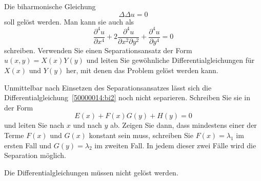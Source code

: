 Die biharmonische Gleichung
\begin{equation}
\Delta\Delta u =0
\label{50000014:bi}
\end{equation}
soll
gelöst werden.
Man kann sie auch als
\begin{equation}
\frac{\partial^4u}{\partial x^4}
+
2\frac{\partial^4u}{\partial x^2\partial y^2}
+
\frac{\partial^4u}{\partial y^4}
=
0
\label{50000014:bi2}
\end{equation}
schreiben.
Verwenden Sie einen Separationsansatz der Form $u(x,y)=X(x)Y(y)$
und leiten Sie gewöhnliche Differentialgleichungen für $X(x)$ und $Y(y)$
her, mit denen das Problem gelöst werden kann.

\begin{hinweis}
Unmittelbar nach Einsetzen des Separationsansatzes lässt sich die 
Differentialgleichung~\eqref{50000014:bi2} noch nicht separieren.
Schreiben Sie sie in der Form
\[
E(x) + F(x)G(y) + H(y) = 0
\]
und leiten Sie nach $x$ und nach $y$ ab.
Zeigen Sie dann, dass mindestens einer der Terme $F(x)$ und $G(x)$ konstant
sein muss, schreiben Sie $F(x)=\lambda_1$ im ersten Fall und $G(y)=\lambda_2$ 
im zweiten Fall.
In jedem dieser zwei Fälle wird die Separation möglich.

Die Differentialgleichungen müssen nicht gelöst werden.
\end{hinweis}

